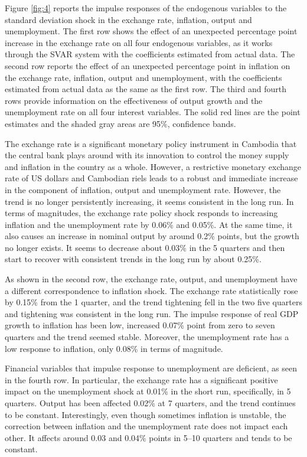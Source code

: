 \documentclass[11pt,letterpaper]{article}
\begin{document}
Figure \ref{fig:4} reports the impulse responses of the endogenous variables to the standard deviation shock in the exchange rate, inflation, output and unemployment. The first row shows the effect of an unexpected percentage point increase in the exchange rate on all four endogenous variables, as it works through the SVAR system with the coefficients estimated from actual data. The second row reports the effect of an unexpected percentage point in inflation on the exchange rate, inflation, output and unemployment, with the coefficients estimated from actual data as the same as the first row.  The third and fourth rows provide information on the effectiveness of output growth and the unemployment rate on all four interest variables. The solid red lines are the point estimates and the shaded gray areas are 95\%, confidence bands. 


The exchange rate is a significant monetary policy instrument in Cambodia that the central bank plays around with its innovation to control the money supply and inflation in the country as a whole. However, a restrictive monetary exchange rate of US dollars and Cambodian riels leads to a robust and immediate increase in the component of inflation, output and unemployment rate. However, the trend is no longer persistently increasing, it seems consistent in the long run. In terms of magnitudes, the exchange rate policy shock responds to increasing inflation and the unemployment rate by 0.06\% and 0.05\%. At the same time, it also causes an increase in nominal output by around 0.2\% points, but the growth no longer exists. It seems to decrease about 0.03\% in the 5 quarters and then start to recover with consistent trends in the long run by about 0.25\%. 

As shown in the second row, the exchange rate, output, and unemployment have a different correspondence to inflation shock. The exchange rate statistically rose by 0.15\% from the 1 quarter, and the trend tightening fell in the two five quarters and tightening was consistent in the long run. The impulse response of real GDP growth to inflation has been low, increased 0.07\% point from zero to seven quarters and the trend seemed stable. Moreover, the unemployment rate has a low response to inflation, only 0.08\% in terms of magnitude. 


Financial variables that impulse response to unemployment are deficient, as seen in the fourth row. In particular, the exchange rate has a significant positive impact on the unemployment shock at 0.01\% in the short run, specifically, in 5 quarters. Output has been affected 0.02\% at 7 quarters, and the trend continues to be constant. Interestingly, even though sometimes inflation is unstable, the correction between inflation and the unemployment rate does not impact each other. It affects around 0.03 and 0.04\% points in 5--10 quarters and tends to be constant. 
\end{document}

